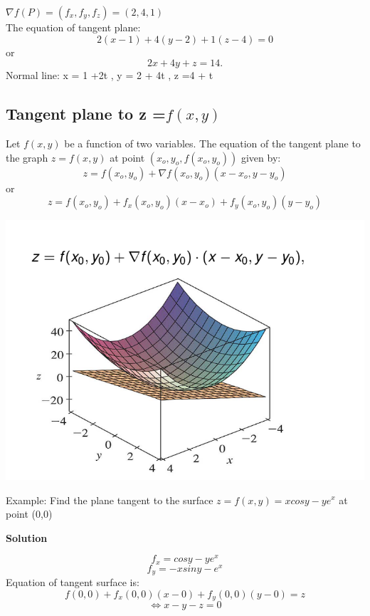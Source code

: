 \documentclass[12pt]{article}
\begin{document}
$\nabla f(P) = (f_x,f_y,f_z) = (2,4,1)$\\
The equation of tangent plane: 
$$ 2(x-1) + 4(y - 2)+ 1(z-4) = 0$$
or 
$$ 2x + 4y + z = 14.$$
Normal line: x = 1 +2t , y = 2 + 4t   , z =4 + t
\subsection{Tangent plane to z =$f(x,y)$ }
\begin{mybox}
    Let $f(x,y)$ be a function of two variables. The equation of the tangent plane to the graph $z = f(x,y)$ at point $(x_o, y_o, f(x_o,y_o))$ given by:
    $$z = f(x_o,y_o) + \nabla f(x_o,y_o)(x-x_o,y-y_o)$$
    or $$z = f(x_o,y_o) + f_x(x_o,y_o)(x-x_o)+f_y(x_o,y_o)(y-y_o)$$
\end{mybox}
\begin{center}
    \includegraphics[scale  = 0.5]{11.png}
\end{center}

Example: Find the plane tangent to the surface $z = f(x,y) = xcosy - ye^x$ at point (0,0)
 \begin{center}
     \textbf{Solution} 
 \end{center}
$$f_x = cosy - ye^x$$
$$f_y = -xsiny - e^x$$
Equation of tangent surface is:
$$f(0,0) + f_x(0,0)(x-0) +f_y(0,0)(y-0) = z$$
$$\Leftrightarrow x - y - z = 0$$
\end{document}
